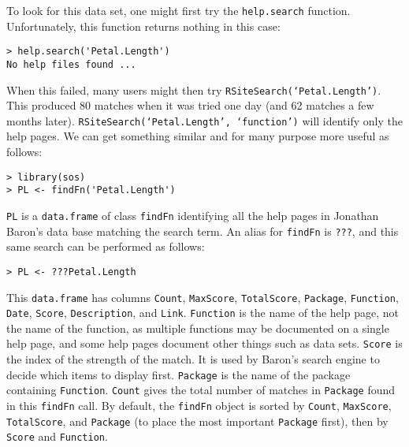 To look for this data set, one might first try
the {\tt help.search} function.  Unfortunately, this function
returns nothing in this case:
\begin{verbatim}
> help.search('Petal.Length')
No help files found ...
\end{verbatim}
When this failed, many users might then try
{\tt RSiteSearch(`Petal.Length')}.  This produced 80 matches
when it was tried one day (and 62 matches a few months later).
{\tt RSiteSearch(`Petal.Length', `function')} will identify
only the help pages.  We can get something similar and for
many purpose more useful as follows:
\begin{verbatim}
> library(sos)
> PL <- findFn('Petal.Length')
\end{verbatim}
{\tt PL} is a {\tt data.frame} of class {\tt findFn} identifying
all the help pages in Jonathan Baron's data base matching the
search term.  An alias for {\tt findFn} is {\tt ???}, and this same
search can be performed as follows:
\begin{verbatim}
> PL <- ???Petal.Length
\end{verbatim}
This {\tt data.frame} has columns {\tt Count},
{\tt MaxScore}, {\tt TotalScore}, {\tt Package}, {\tt Function},
{\tt Date}, {\tt Score}, {\tt Description}, and {\tt Link}.
{\tt Function} is the name of the help page, not the name of the
function, as multiple functions may be documented on a single
help page, and some help pages document other things such as data
sets.  {\tt Score} is the index of the strength of the match.  It is used
by Baron's search engine to decide which items to display first.
{\tt Package} is the name of the package containing {\tt Function}.
{\tt Count} gives the total number of matches in {\tt Package} found in this
{\tt findFn} call.  By default, the {\tt findFn} object is sorted by {\tt Count}, {\tt MaxScore}, {\tt TotalScore},
and {\tt Package} (to place the most important {\tt Package}
first), then by {\tt Score} and {\tt Function}.

